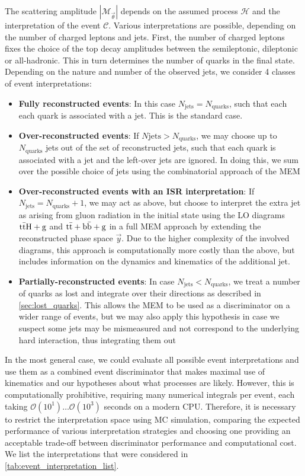 The scattering amplitude $|\mathcal{M}_{\vec{\theta}}|$ depends on the assumed process $\mathcal{H}$ and the interpretation of the event $\mathcal{C}$. Various interpretations are possible, depending on the number of charged leptons and jets. First, the number of charged leptons fixes the choice of the top decay amplitudes between the semileptonic, dileptonic or all-hadronic. This in turn determines the number of quarks in the final state. Depending on the nature and number of the observed jets, we consider 4 classes of event interpretations:
\begin{itemize}
\item \textbf{Fully reconstructed events}: In this case $N_{\mathrm{jets}} = N_{\mathrm{quarks}}$, such that each each quark is associated with a jet. This is the standard case.
\item \textbf{Over-reconstructed events}: If $N{\mathrm{jets}} > N_{\mathrm{quarks}}$, we may choose up to $N_{\mathrm{quarks}}$ jets out of the set of reconstructed jets, such that each quark is associated with a jet and the left-over jets are ignored. In doing this, we sum over the possible choice of jets using the combinatorial approach of the MEM
\item \textbf{Over-reconstructed events with an ISR interpretation}: If $N_{\mathrm{jets}} = N_{\mathrm{quarks}} + 1$, we may act as above, but choose to interpret the extra jet as arising from gluon radiation in the initial state using the LO diagrams $\mathrm{t} \bar{\mathrm{t}} \mathrm{H} + \mathrm{g}$ and  $\mathrm{t} \bar{\mathrm{t}} + \mathrm{b}\bar{\mathrm{b}} + \mathrm{g}$ in a full MEM approach by extending the reconstructed phase space $\vec{y}$. Due to the higher complexity of the involved diagrams, this approach is computationally more costly than the above, but includes information on the dynamics and kinematics of the additional jet.
\item \textbf{Partially-reconstructed events}: In case $N_{\mathrm{jets}} < N_{\mathrm{quarks}}$, we treat a number of quarks as lost and integrate over their directions as described in \cref{sec:lost_quarks}. This allows the MEM to be used as a discriminator on a wider range of events, but we may also apply this hypothesis in case we suspect some jets may be mismeasured and not correspond to the underlying hard interaction, thus integrating them out
\end{itemize}

In the most general case, we could evaluate all possible event interpretations and use them as a combined event discriminator that makes maximal use of kinematics and our hypotheses about what processes are likely. However, this is computationally prohibitive, requiring many numerical integrals per event, each taking $\mathcal{O}(10^1)\dots \mathcal{O}(10^3)$ seconds on a modern CPU. Therefore, it is necessary to restrict the interpretation space using MC simulation, comparing the expected performance of various interpretation strategies and choosing one providing an acceptable trade-off between discriminator performance and computational cost. We list the interpretations that were considered in \cref{tab:event_interpretation_list}.

